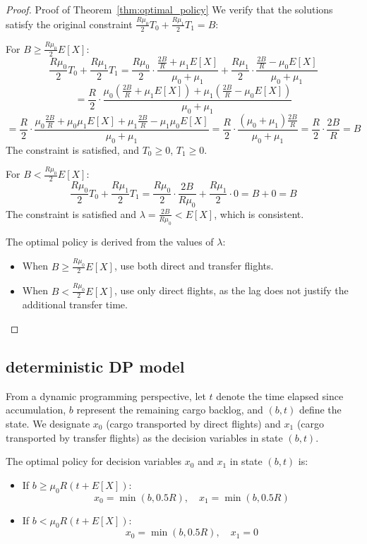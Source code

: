 \documentclass[opre,sglanonrev]{informs4}
\begin{document}
\begin{proof}{Proof of Theorem~\ref{thm:optimal_policy}}
We verify that the solutions satisfy the original constraint \( \frac{R \mu_0}{2} T_0 + \frac{R \mu_1}{2} T_1 = B \):

For \( B \geq \frac{R \mu_0}{2} E[X] \):
\[
\frac{R \mu_0}{2} T_0 + \frac{R \mu_1}{2} T_1 = \frac{R \mu_0}{2} \cdot \frac{\frac{2B}{R} + \mu_1 E[X]}{\mu_0 + \mu_1} + \frac{R \mu_1}{2} \cdot \frac{\frac{2B}{R} - \mu_0 E[X]}{\mu_0 + \mu_1}
\]
\[
= \frac{R}{2} \cdot \frac{\mu_0 \left( \frac{2B}{R} + \mu_1 E[X] \right) + \mu_1 \left( \frac{2B}{R} - \mu_0 E[X] \right)}{\mu_0 + \mu_1}
\]
\[
= \frac{R}{2} \cdot \frac{\mu_0 \frac{2B}{R} + \mu_0 \mu_1 E[X] + \mu_1 \frac{2B}{R} - \mu_1 \mu_0 E[X]}{\mu_0 + \mu_1} = \frac{R}{2} \cdot \frac{(\mu_0 + \mu_1) \frac{2B}{R}}{\mu_0 + \mu_1} = \frac{R}{2} \cdot \frac{2B}{R} = B
\]
The constraint is satisfied, and \( T_0 \geq 0 \), \( T_1 \geq 0 \).

For \( B < \frac{R \mu_0}{2} E[X] \):
\[
\frac{R \mu_0}{2} T_0 + \frac{R \mu_1}{2} T_1 = \frac{R \mu_0}{2} \cdot \frac{2B}{R \mu_0} + \frac{R \mu_1}{2} \cdot 0 = B + 0 = B
\]
The constraint is satisfied and \( \lambda = \frac{2B}{R \mu_0} < E[X] \), which is consistent.

The optimal policy is derived from the values of \( \lambda \):
\begin{itemize}
    \item When \( B \geq \frac{R \mu_0}{2} E[X] \), use both direct and transfer flights.
    \item When \( B < \frac{R \mu_0}{2} E[X] \), use only direct flights, as the lag does not justify the additional transfer time.
\end{itemize}
\end{proof}

\subsection{deterministic DP model}

From a dynamic programming perspective, let \( t \) denote the time elapsed since accumulation, \( b \) represent the remaining cargo backlog, and \( (b, t) \) define the state. We designate \( x_0 \) (cargo transported by direct flights) and \( x_1 \) (cargo transported by transfer flights) as the decision variables in state \( (b, t) \).
\begin{theorem}
\label{thm:optimal_policy_dp}
The optimal policy for decision variables \( x_0 \) and \( x_1 \) in state \( (b, t) \) is:
\begin{itemize}
    \item If \( b \geq \mu_0 R (t + E[X]) \):
    \[
    x_0 = \min(b, 0.5R), \quad x_1 = \min(b, 0.5R)
    \]
    \item If \( b < \mu_0 R (t + E[X]) \):
    \[
    x_0 = \min(b, 0.5R), \quad x_1 = 0
    \]
\end{itemize}
\end{theorem}
\end{document}
